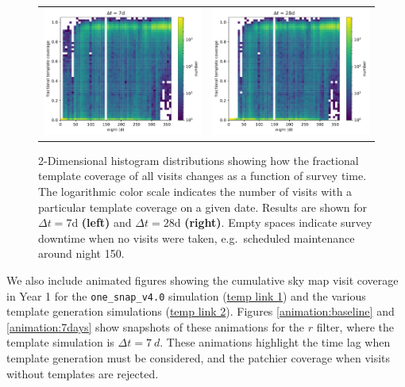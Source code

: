 \documentclass[preprintm,linenumbers]{aastex631}
\newcommand{\baseline}{\texttt{one\_snap\_v4.0}\xspace}
\begin{document}
  \begin{figure}
      \centering
      			\begin{tabular}{c c}
      \includegraphics[width=0.5\linewidth]{results/fractional_template_coverage_first_year_one_snap_v4_0_10yrs_db_noDD_noTwi_7_2d_hist.pdf} &
            \includegraphics[width=0.5\linewidth]{results/fractional_template_coverage_first_year_one_snap_v4_0_10yrs_db_noDD_noTwi_28_2d_hist.pdf} \\
\end{tabular}
\caption{2-Dimensional histogram distributions showing how the fractional template coverage of all visits changes as a function of survey time.
The logarithmic color scale indicates the number of visits with a particular template coverage on a given date. Results are shown for $\Delta t = 7$d \textbf{(left)} and $\Delta t = 28$d \textbf{(right)}.
Empty spaces indicate survey downtime when no visits were taken, e.g.\ scheduled maintenance around night 150.
}
\label{fig:fractional_template_coverage-2d}
  \end{figure}
  
		We also include animated figures showing the cumulative sky map visit coverage in Year 1 for the \baseline simulation (\href{update-links}{temp link 1}) and the various template generation simulations (\href{update-links}{temp link 2}). 
  Figures \ref{animation:baseline} and \ref{animation:7days} show snapshots of these animations for the $r$ filter, where the template simulation is $\Delta t = 7\ \si{d}$.
		These animations highlight the time lag when template generation must be considered, and the patchier coverage when visits without templates are rejected.
		
\end{document}
